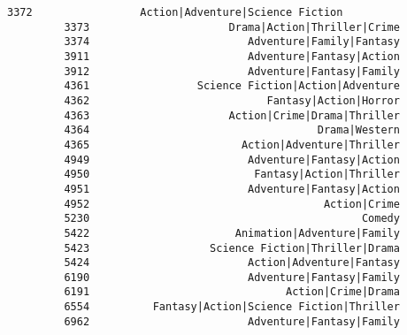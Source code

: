 \documentclass[11pt]{article}
\begin{document}
\begin{Verbatim}[commandchars=\\\{\}]
         3372                 Action|Adventure|Science Fiction   
         3373                      Drama|Action|Thriller|Crime   
         3374                         Adventure|Family|Fantasy   
         3911                         Adventure|Fantasy|Action   
         3912                         Adventure|Fantasy|Family   
         4361                 Science Fiction|Action|Adventure   
         4362                            Fantasy|Action|Horror   
         4363                      Action|Crime|Drama|Thriller   
         4364                                    Drama|Western   
         4365                        Action|Adventure|Thriller   
         4949                         Adventure|Fantasy|Action   
         4950                          Fantasy|Action|Thriller   
         4951                         Adventure|Fantasy|Action   
         4952                                     Action|Crime   
         5230                                           Comedy   
         5422                       Animation|Adventure|Family   
         5423                   Science Fiction|Thriller|Drama   
         5424                         Action|Adventure|Fantasy   
         6190                         Adventure|Fantasy|Family   
         6191                               Action|Crime|Drama   
         6554          Fantasy|Action|Science Fiction|Thriller   
         6962                         Adventure|Fantasy|Family   
         

\end{Verbatim}
\end{document}
